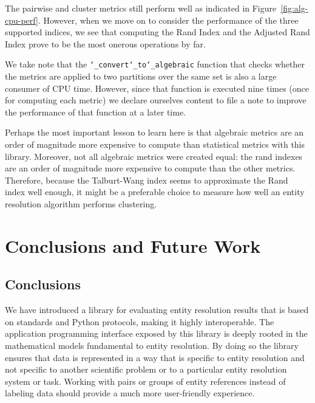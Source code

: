 \documentclass[a4paper,twoside]{article}
\begin{document}
    The pairwise and cluster metrics still perform well as indicated in
    Figure~\ref{fig:alg-cpu-perf}.
    However, when we move on to consider the performance of the three supported
    indices, we see that computing the Rand Index and the Adjusted Rand Index
    prove to be the most onerous operations by far.

    We take note that the \texttt{\char`_convert\char`_to\char`_algebraic}
    function that checks whether the metrics are applied to two partitions over
    the same set is also a large consumer of CPU time.
    However, since that function is executed nine times (once for computing each
    metric) we declare ourselves content to file a note to improve the
    performance of that function at a later time.

    Perhaps the most important lesson to learn here is that algebraic metrics
    are an order of magnitude more expensive to compute than statistical
    metrics with this library.
    Moreover, not all algebraic metrics were created equal: the rand indexes
    are an order of magnitude more expensive to compute than the other metrics.
    Therefore, because the Talburt-Wang index seems to approximate the Rand
    index well enough, it might be a preferable choice to measure how well an
    entity resolution algorithm performs clustering.

    \section{Conclusions and Future Work}\label{sec:conclusions_and_future}

    \subsection{Conclusions}

    We have introduced a library for evaluating entity resolution results that
    is based on standards and Python protocols, making it highly interoperable.
    The application programming interface exposed by this library is deeply
    rooted in the mathematical models fundamental to entity resolution.
    By doing so the library ensures that data is represented in a way that is
    specific to entity resolution and not specific to another scientific problem
    or to a particular entity resolution system or task.
    Working with pairs or groups of entity references instead of labeling
    data should provide a much more user-friendly experience.
\end{document}
